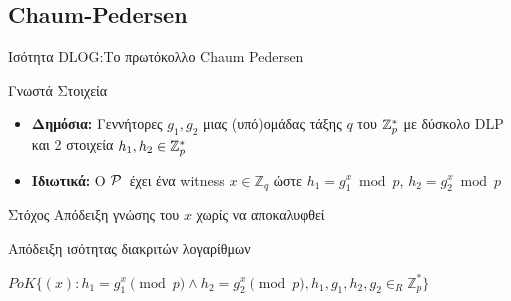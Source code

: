 \documentclass[10pt,handout]{beamer}
\begin{document}
\subsection{Chaum-Pedersen}
\begin{frame}[allowframebreaks]{Ισότητα DLOG:Το πρωτόκολλο Chaum Pedersen}
\begin{block}{Γνωστά Στοιχεία}
\begin{itemize}
\item \textbf{Δημόσια:} Γεννήτορες $g_1, g_2$ μιας (υπό)ομάδας τάξης $q$ του $\mathbb{Z}^*_{p}$ με δύσκολο DLP και 2 στοιχεία $h_1, h_2 \in \mathbb{Z}^*_{p}$ 
\item \textbf{Ιδιωτικά:} O $\mathcal{P}\,$ έχει ένα witness $x \in \mathbb{Z}_q$  ώστε $h_1 = g_{1}^{x} \bmod{p}$, $h_2 = g_{2}^{x} \bmod{p}$
\end{itemize}
\end{block}

\begin{block}{Στόχος}
Απόδειξη γνώσης του $x$ χωρίς να αποκαλυφθεί

Απόδειξη ισότητας διακριτών λογαρίθμων
\end{block}

\begin{small}
$PoK \{(x): h_1 = g_1^x \pmod{p} \wedge h_2 = g_2^x \pmod{p},  h_1,g_1,h_2,g_2 \in_R \mathbb{Z}_p^* \}$
\end{small}

\begin{columns}


\end{columns}
\end{frame}
\end{document}
